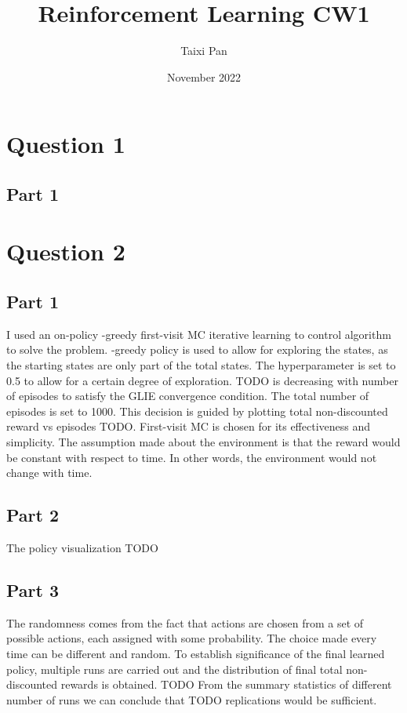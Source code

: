 \documentclass{article}
\title{Reinforcement Learning CW1}
\author{Taixi Pan}
\date{November 2022}
\begin{document}
    \maketitle


    \section{Question 1}\label{sec:question-1}

    \subsection{Part 1}\label{subsec:part-1}


    \section{Question 2}\label{sec:question-2}

    \subsection{Part 1}\label{subsec:part-12}
    I used an on-policy \epsilon-greedy first-visit MC iterative learning to control algorithm to solve the problem.
    \epsilon-greedy policy is used to allow for exploring the states, as the starting states are only part of the total states.
    The hyperparameter \epsilon is set to 0.5 to allow for a certain degree of exploration.
    TODO \epsilon is decreasing with number of episodes to satisfy the GLIE convergence condition.
    The total number of episodes is set to 1000.
    This decision is guided by plotting total non-discounted reward vs episodes TODO.
    First-visit MC is chosen for its effectiveness and simplicity.
    The assumption made about the environment is that the reward would be constant with respect to time.
    In other words, the environment would not change with time.

    \subsection{Part 2}\label{subsec:part-2}
    The policy visualization TODO

    \subsection{Part 3}\label{subsec:part-3}
    The randomness comes from the fact that actions are chosen from a set of possible actions, each assigned with some probability.
    The choice made every time can be different and random.
    To establish significance of the final learned policy, multiple runs are carried out and the distribution of final total non-discounted rewards is obtained.
    TODO From the summary statistics of different number of runs we can conclude that TODO replications would be sufficient.
\end{document}
